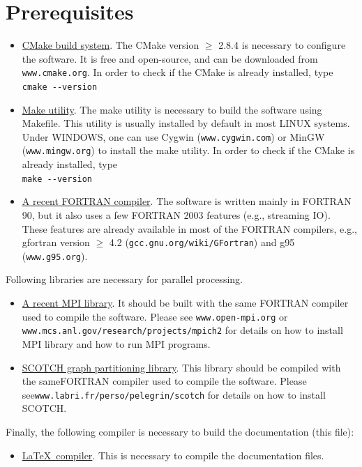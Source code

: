 \section{Prerequisites}
\begin{itemize}[-]
  \item \underline{CMake build system}. The CMake version $\ge$ 2.8.4 is necessary to configure the software. It is free and open-source, and can be downloaded from \texttt{www.cmake.org}. In order to check if the CMake is already installed, type\\
  \texttt{cmake -{}-version}
  
  \item \underline{Make utility}. The make utility is necessary to build the software using Makefile. This utility is usually installed by default in most LINUX systems. Under WINDOWS, one can use Cygwin (\texttt{www.cygwin.com}) or MinGW (\texttt{www.mingw.org}) to install the make utility.  In order to check if the CMake is already installed, type\\
  \texttt{make -{}-version}
  \item \underline{A recent FORTRAN compiler}. The software is written mainly in FORTRAN 90, but it also uses a few FORTRAN 2003 features (e.g., streaming IO). These features are already available in most of the FORTRAN compilers, e.g., gfortran version $\ge$ 4.2 (\texttt{gcc.gnu.org/wiki/GFortran}) and g95 (\texttt{www.g95.org}).
\end{itemize}
  Following libraries are necessary for parallel processing.
\begin{itemize}[-]
  \item \underline{A recent MPI library}. It should be built with the same FORTRAN compiler used to compile the software. Please see \texttt{www.open-mpi.org} or \linebreak\texttt{www.mcs.anl.gov/research/projects/mpich2} for details on how to install MPI library and how to run MPI programs.
  \item \underline{SCOTCH graph partitioning library}. This library should be compiled with the same\linebreak FORTRAN compiler used to compile the software. Please see\linebreak \texttt{www.labri.fr/perso/pelegrin/scotch} for details on how to install SCOTCH.
\end{itemize}

  Finally, the following compiler is necessary to build the documentation (this file):
\begin{itemize}[-]
  \item \underline{\LaTeX\ compiler}. This is necessary to compile the documentation files.
\end{itemize}

